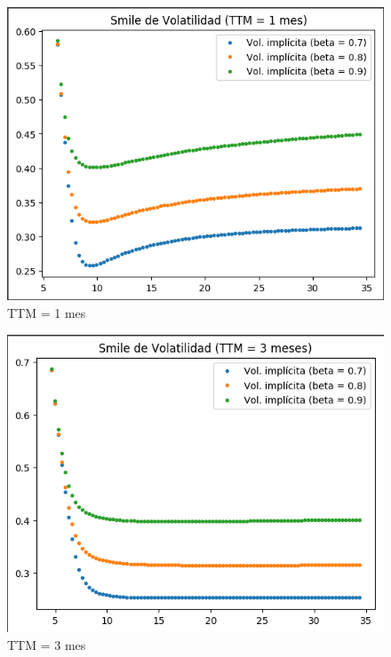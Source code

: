 \documentclass[titlepage, 10pt,]{article}
\begin{document}
{\begin{figure}[h]
	\centering
	\includegraphics[scale=0.65]{TTM1}
	\caption{TTM = 1 mes}
\end{figure}

\begin{figure}[!]
	\centering
	\includegraphics[scale=0.65]{TTM3}
	\caption{TTM = 3 mes}
\end{figure}

}
\end{document}

